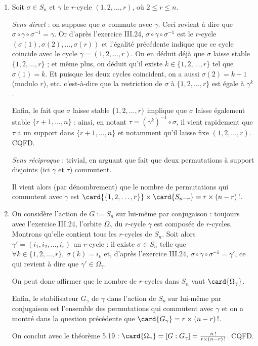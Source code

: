 \begin{enumerate}
  \item Soit $\sigma \in S_n$ et $\gamma$ le $r$-cycle $(1,2,\ldots, r)$, où $2 \leq r \leq n$.

  \emph{Sens direct} : on suppose que $\sigma$ commute avec $\gamma$. Ceci revient à dire que $\sigma \circ \gamma \circ \sigma^{-1} = \gamma$. Or d'après l'exercice III.24, $\sigma \circ \gamma \circ \sigma^{-1}$ est le $r$-cycle $\left(\sigma(1), \sigma(2),\ldots, \sigma(r)\right)$ et l'égalité précédente indique que ce cycle coincide avec le cycle $\gamma = (1,2,\ldots, r)$. On en déduit déjà que $\sigma$ laisse stable $\{1,2,\ldots, r\}$ ; et même plus, on déduit qu'il existe $k\in \{1,2,\ldots, r\}$ tel que $\sigma(1) = k$. Et puisque les deux cycles coincident, on a aussi $\sigma(2) = k+1$ (modulo $r$), etc. c'est-à-dire que la restriction de $\sigma$ à $\{1,2,\ldots, r\}$ est égale à $\gamma^k$.

  Enfin, le fait que $\sigma$ laisse stable $\{1,2,\ldots, r\}$ implique que $\sigma$ laisse également stable $\{r+1,\ldots, n\}$ : ainsi, en notant $\tau = \left(\gamma^k \right)^{-1} \circ \sigma$, il vient rapidement que $\tau$ a un support dans $\{r+1,\ldots, n\}$ et notamment qu'il laisse fixe $(1,2,\ldots, r)$. CQFD.

  \emph{Sens réciproque} : trivial, en arguant que fait que deux permutations à support disjoints (ici $\gamma$ et $\tau$) commutent.

  Il vient alors (par dénombrement) que le nombre de permutations qui commutent avec $\gamma$ est $\card{ \{1,2,\ldots, r\}}\times \card{S_{n-r}} = r\times (n-r)\,!$.

  \item On considère l'action de $G:=S_n$ sur lui-même par conjugaison : toujours avec l'exercice III.24, l'orbite $\Omega_{\gamma}$ du $r$-cycle $\gamma$ est composée de $r$-cycles. Montrons qu'elle contient tous les $r$-cycles de $S_n$. Soit alors $\gamma' = (i_1, i_2,\ldots, i_r)$ un $r$-cycle : il existe $\sigma\in S_n$ telle que $\forall k\in \{1,2,\ldots, r\}, ~\sigma(k) = i_k$ et, d'après l'exercice III.24, $\sigma\circ \gamma \circ \sigma^{-1} = \gamma'$, ce qui revient à dire que $\gamma' \in \Omega_{\gamma}$.

  On peut donc affirmer que le nombre de $r$-cycles dans $S_n$ vaut $\card{\Omega_{\gamma}}$.

  Enfin, le stabilisateur $G_{\gamma}$ de $\gamma$ dans l'action de $S_n$ sur lui-même par conjugaison est l'ensemble des permutations qui commutent avec $\gamma$ et on a montré dans la question précédente que $\card{G_{\gamma}} = r\times (n-r)\,!$.

  On conclut avec le théorème 5.19 : $\card{\Omega_{\gamma}} = [G:G_{\gamma}] = \frac{n\,!}{r\times (n-r)\,!}$. CQFD.



\end{enumerate}
